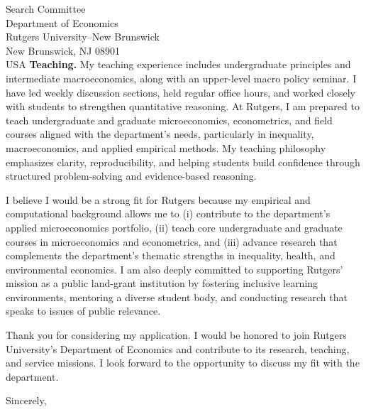 \documentclass[11pt,letterpaper]{letter}
\begin{document}
\begin{letter}{Search Committee \\
Department of Economics \\
Rutgers University--New Brunswick \\
New Brunswick, NJ 08901 \\ USA}
\textbf{Teaching.} My teaching experience includes undergraduate principles and intermediate macroeconomics, along with an upper-level macro policy seminar. I have led weekly discussion sections, held regular office hours, and worked closely with students to strengthen quantitative reasoning. At Rutgers, I am prepared to teach undergraduate and graduate microeconomics, econometrics, and field courses aligned with the department’s needs, particularly in inequality, macroeconomics, and applied empirical methods. My teaching philosophy emphasizes clarity, reproducibility, and helping students build confidence through structured problem-solving and evidence-based reasoning.

I believe I would be a strong fit for Rutgers because my empirical and computational background allows me to (i) contribute to the department’s applied microeconomics portfolio, (ii) teach core undergraduate and graduate courses in microeconomics and econometrics, and (iii) advance research that complements the department’s thematic strengths in inequality, health, and environmental economics. I am also deeply committed to supporting Rutgers’ mission as a public land-grant institution by fostering inclusive learning environments, mentoring a diverse student body, and conducting research that speaks to issues of public relevance.

Thank you for considering my application. I would be honored to join Rutgers University’s Department of Economics and contribute to its research, teaching, and service missions. I look forward to the opportunity to discuss my fit with the department.

\closing{Sincerely,}

\end{letter}
\end{document}
